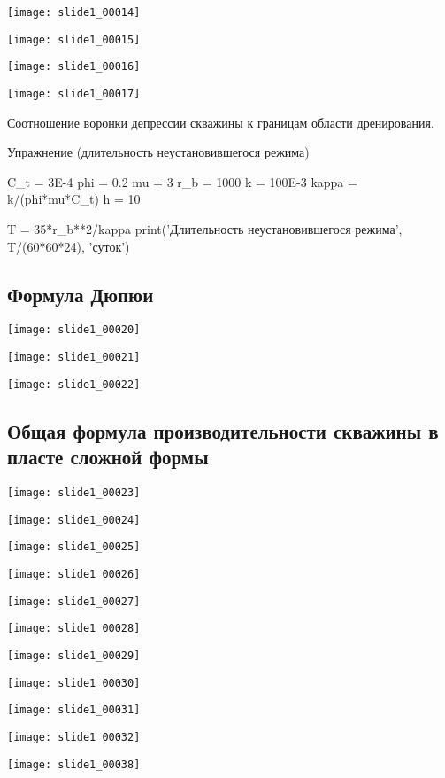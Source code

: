 \documentclass[main.tex]{subfiles}
\begin{document}
\texttt{[image: slide1\_00014]}

\texttt{[image: slide1\_00015]}

\texttt{[image: slide1\_00016]}

\texttt{[image: slide1\_00017]}

Соотношение воронки депрессии скважины к границам области дренирования.

Упражнение (длительность неустановившегося режима)

\begin{python}
C_t = 3E-4
phi = 0.2
mu = 3
r_b = 1000
k = 100E-3
kappa = k/(phi*mu*C_t)
h = 10

T = 35*r_b**2/kappa
print('Длительность неустановившегося режима', T/(60*60*24), 'суток')
\end{python}

\subsection{Формула Дюпюи}
\texttt{[image: slide1\_00020]}

\texttt{[image: slide1\_00021]}

\texttt{[image: slide1\_00022]}

\subsection{Общая формула производительности скважины в пласте сложной формы}

\texttt{[image: slide1\_00023]}

\texttt{[image: slide1\_00024]}

\texttt{[image: slide1\_00025]}

\texttt{[image: slide1\_00026]}

\texttt{[image: slide1\_00027]}

\texttt{[image: slide1\_00028]}

\texttt{[image: slide1\_00029]}

\texttt{[image: slide1\_00030]}

\texttt{[image: slide1\_00031]}

\texttt{[image: slide1\_00032]}

\texttt{[image: slide1\_00038]}
\end{document}
